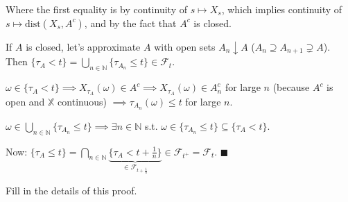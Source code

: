 Where the first equality is by continuity of $s \mapsto X_s$, which implies continuity of $s \mapsto \text{dist}(X_s, A^c)$, and by the fact that $A^c$ is closed.

If $A$ is closed, let's approximate $A$ with open sets $A_n \downarrow A$ ($A_n \supseteq A_{n+1} \supsetneq A$).
Then $\{\tau_A < t\} = \bigcup_{n \in \mathbb{N}} \{\tau_{A_n} \leq t\} \in \mathcal{F}_t$.

$\omega \in \{\tau_A < t\} \implies X_{\tau_A}(\omega) \in A^c \implies X_{\tau_A}(\omega) \in A_n^c$ for large $n$ (because $A^c$ is open and $\mathbb{X}$ continuous) $\implies \tau_{A_n}(\omega) \leq t$ for large $n$.

$\omega \in \bigcup_{n \in \mathbb{N}} \{\tau_{A_n} \leq t\} \implies \exists n \in \mathbb{N}$ s.t. $\omega \in \{\tau_{A_n} \leq t\} \subseteq \{\tau_A < t\}$.

Now: $\{\tau_A \leq t\} = \bigcap_{n \in \mathbb{N}} \underbrace{\{\tau_A < t + \frac{1}{n}\}}_{\in \mathcal{F}_{t + \frac{1}{n}}} \in \mathcal{F}_{t^+} = \mathcal{F}_t$. $\blacksquare$

\begin{homework}
    Fill in the details of this proof.
\end{homework}
